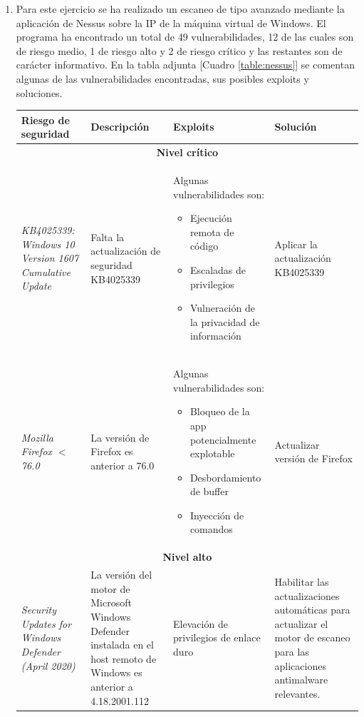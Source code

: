 \documentclass[10pt,a4paper]{article}
\begin{document}
\begin{enumerate}[label=\textbf{\alph*)}]
\begin{itemize}
\end{itemize}


\item Para este ejercicio se ha realizado un escaneo de tipo avanzado mediante la aplicación de Nessus sobre la IP de la máquina virtual de Windows. El programa ha encontrado un total de 49 vulnerabilidades, 12 de las cuales son de riesgo medio, 1 de riesgo alto y 2 de riesgo crítico y las restantes son de carácter informativo.
En la tabla adjunta [Cuadro \ref{table:nessus}] se comentan algunas de las vulnerabilidades encontradas, sus posibles exploits y soluciones.\\

\begin{longtable}{| p{} | p{} | p{} | p{} |} 
\hline 
 \textbf{Riesgo de seguridad} & \textbf{Descripción} & \textbf{Exploits} & \textbf{Solución} \\ 
\hline 
\multicolumn{4}{|c|}{\textbf{Nivel crítico}} \\ 
\hline 
\textit{KB4025339: Windows 10 Version 1607 Cumulative Update} & Falta la actualización de seguridad KB4025339 & Algunas vulnerabilidades son:
\begin{itemize}
\item Ejecución remota de código
\item Escaladas de privilegios
\item Vulneración de la privacidad de información
\end{itemize}
 & Aplicar la actualización KB4025339\\ 
\hline 
\textit{Mozilla Firefox $<$ 76.0} & La versión de Firefox es anterior a 76.0 & Algunas vulnerabilidades son:
\begin{itemize}
\item Bloqueo de la app potencialmente explotable
\item Desbordamiento de buffer
\item Inyección de comandos
\end{itemize}
 & Actualizar versión de Firefox \\ 
\hline 
\multicolumn{4}{|c|}{\textbf{Nivel alto}} \\ 
\hline 
\textit{Security Updates for Windows Defender (April 2020)} & La versión del motor de Microsoft Windows Defender instalada en el host remoto de Windows es anterior a 4.18.2001.112 & Elevación de privilegios de enlace duro & Habilitar las actualizaciones automáticas para actualizar el motor de escaneo para las aplicaciones antimalware relevantes. \\ 

\end{longtable}
\end{enumerate}
\end{document}
